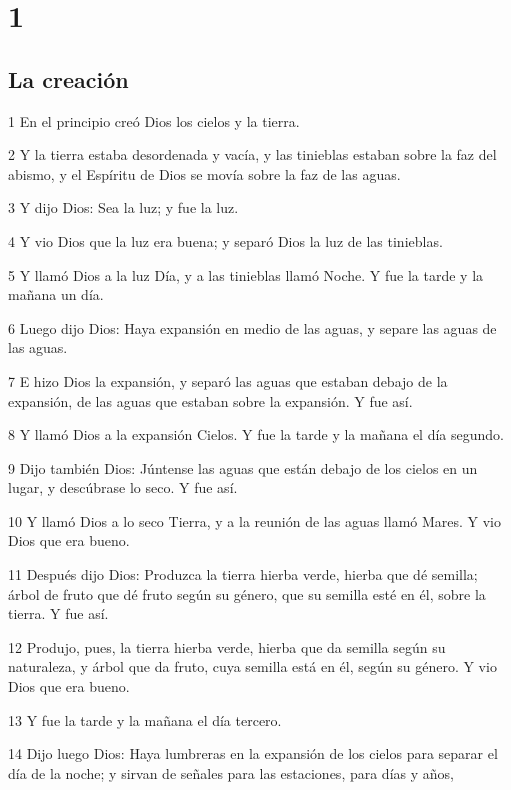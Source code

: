 
\chapter{1}

\section{La creación}

1 En el principio creó Dios los cielos y la tierra.

2 Y la tierra estaba desordenada y vacía, y las tinieblas estaban sobre la faz del abismo, y el Espíritu de Dios se movía sobre la faz de las aguas.

3 Y dijo Dios: Sea la luz; y fue la luz.

4 Y vio Dios que la luz era buena; y separó Dios la luz de las tinieblas.

5 Y llamó Dios a la luz Día, y a las tinieblas llamó Noche. Y fue la tarde y la mañana un día.

6 Luego dijo Dios: Haya expansión en medio de las aguas, y separe las aguas de las aguas.

7 E hizo Dios la expansión, y separó las aguas que estaban debajo de la expansión, de las aguas que estaban sobre la expansión. Y fue así.

8 Y llamó Dios a la expansión Cielos. Y fue la tarde y la mañana el día segundo.

9 Dijo también Dios: Júntense las aguas que están debajo de los cielos en un lugar, y descúbrase lo seco. Y fue así.

10 Y llamó Dios a lo seco Tierra, y a la reunión de las aguas llamó Mares. Y vio Dios que era bueno.

11 Después dijo Dios: Produzca la tierra hierba verde, hierba que dé semilla; árbol de fruto que dé fruto según su género, que su semilla esté en él, sobre la tierra. Y fue así.

12 Produjo, pues, la tierra hierba verde, hierba que da semilla según su naturaleza, y árbol que da fruto, cuya semilla está en él, según su género. Y vio Dios que era bueno.

13 Y fue la tarde y la mañana el día tercero.

14 Dijo luego Dios: Haya lumbreras en la expansión de los cielos para separar el día de la noche; y sirvan de señales para las estaciones, para días y años,

